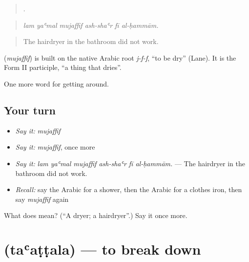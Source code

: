\begin{quote}
     .
\end{quote}

\begin{quote}
\emph{lam yaʿmal mujaffif ash-shaʿr fī al-ḥammām.}
\end{quote}

\begin{quote}
The hairdryer in the bathroom did not work.
\end{quote}

\begin{cousinweb}
\textbf{} (\emph{mujaffif}) is built on the native Arabic root \emph{j-f-f}, \textquotedblleft{}to be dry\textquotedblright{} (Lane). It is the Form II participle, \textquotedblleft{}a thing that dries\textquotedblright{}.
\end{cousinweb}

\begin{grammarlens}[title={What you've built}]
One more word for getting around.
\end{grammarlens}

\subsection*{Your turn}
\begin{itemize}
\raggedright
  \item \emph{Say it:} \emph{mujaffif}
  \item \emph{Say it:} \emph{mujaffif}, once more
  \item \emph{Say it:} \emph{lam yaʿmal mujaffif ash-shaʿr fī al-ḥammām.} — The hairdryer in the bathroom did not work.
  \item \emph{Recall:} say the Arabic for a shower, then the Arabic for a clothes iron, then say \emph{mujaffif} again
\end{itemize}

\begin{tcolorbox}[breakable,colback=teal!4,colframe=teal!35!black,title={Before you move on}]
What does  mean? (\textquotedblleft{}A dryer; a hairdryer\textquotedblright{}.) Say it once more.
\end{tcolorbox}
\section[\texorpdfstring{\ar{تعطل} (taʿaṭṭala)}{تعطل (taʿaṭṭala)}]{ (taʿaṭṭala) — to break down}


